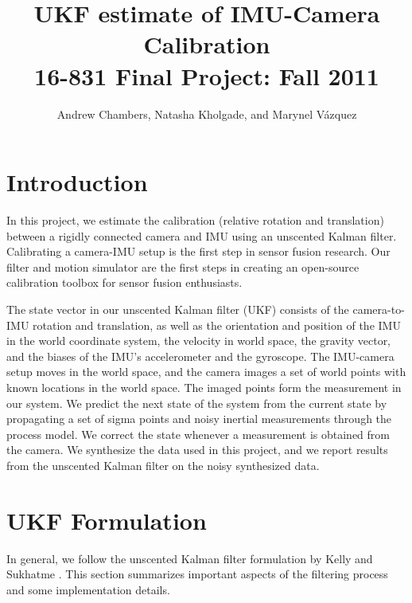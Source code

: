 \documentclass[letterpaper]{article}
\title{
  UKF estimate of IMU-Camera Calibration\\
  \Large{16-831 Final Project: Fall 2011}
}
\author{Andrew Chambers, Natasha Kholgade, and Marynel V\'azquez}
\date{}
\begin{document}
\maketitle

\section{Introduction}

In this project, we estimate the calibration (relative rotation and translation) between a rigidly connected camera and IMU using an unscented Kalman filter. Calibrating a camera-IMU setup is the first step in sensor fusion research. Our filter and motion simulator are the first steps in creating an open-source calibration toolbox for sensor fusion enthusiasts. 

The state vector in our unscented Kalman filter (UKF) consists of the camera-to-IMU rotation and translation, as well as the orientation and position of the IMU in the world coordinate system, the velocity in world space, the gravity vector, and the biases of the IMU's accelerometer and the gyroscope. The IMU-camera setup moves in the world space, and the camera images a set of world points with known locations in the world space. The imaged points form the measurement in our system. We predict the next state of the system from the current state by propagating a set of sigma points and noisy inertial measurements through the process model. We correct the state whenever a measurement is obtained from the camera. We synthesize the data used in this project, and we report results from the unscented Kalman filter on the noisy synthesized data.



\section{UKF Formulation}
\label{sec:UKF}

In general, we follow the unscented Kalman filter formulation by Kelly
and Sukhatme \cite{2011:kelly:article}. This section 
summarizes important aspects of the filtering process and some
implementation details.
\end{document}
